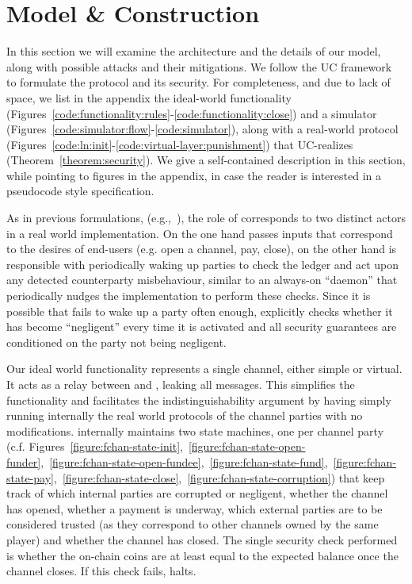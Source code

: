 \section{Model \& Construction}
  In this section we will examine the architecture and the details of our model,
  along with possible attacks and their mitigations. We follow the UC
  framework~\cite{uc} to formulate the protocol and its security. For completeness,
  and due to lack of space, we list in the appendix the ideal-world functionality \fchan
  (Figures~\ref{code:functionality:rules}-\ref{code:functionality:close}) and a
  simulator \simulator (Figures~\ref{code:simulator:flow}-\ref{code:simulator}),
  along with a real-world protocol \pchan
  (Figures~\ref{code:ln:init}-\ref{code:virtual-layer:punishment}) that
  UC-realizes \fchan (Theorem~\ref{theorem:security}). We give a self-contained
  description in this section, while pointing to figures in the appendix, in case
  the reader is interested in a pseudocode style specification. 
 
  As in previous formulations, (e.g.,~\cite{DBLP:conf/csfw/KiayiasL20}), the role of \environment
  corresponds to two distinct actors in a real world implementation. On the one
  hand \environment passes inputs that correspond to the desires of end-users
  (e.g. open a channel, pay, close), on the other hand \environment is
  responsible with periodically waking up parties to check the ledger and act
  upon any detected counterparty misbehaviour, similar to an always-on
  ``daemon'' that periodically nudges the implementation to perform these
  checks. Since it is possible that \environment fails to wake up a party often
  enough, \pchan explicitly checks whether it has become ``negligent'' every
  time it is activated and all security guarantees are conditioned on the party
  not being negligent.

  Our ideal world functionality \fchan represents a single channel, either
  simple or virtual. It acts as a relay between \adversary and \environment,
  leaking all messages. This simplifies the functionality and facilitates the
  indistinguishability argument by having \simulator simply running internally
  the real world protocols of the channel parties \pchan with no modifications.
  \fchan internally maintains two state machines, one per channel party (c.f.
  Figures~\ref{figure:fchan-state-init},~\ref{figure:fchan-state-open-funder},~\ref{figure:fchan-state-open-fundee},~\ref{figure:fchan-state-fund},~\ref{figure:fchan-state-pay},~\ref{figure:fchan-state-close},~\ref{figure:fchan-state-corruption})
  that keep track of which internal parties are corrupted or negligent, whether
  the channel has opened, whether a payment is underway, which external parties
  are to be considered trusted (as they correspond to other channels owned by
  the same player) and whether the channel has closed. The single security check
  performed is whether the on-chain coins are at least equal to the expected
  balance once the channel closes. If this check fails, \fchan halts.

